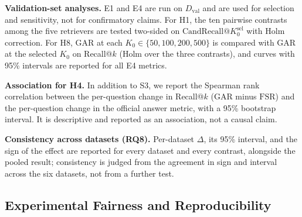 \documentclass[11pt,a4paper]{article}
\begin{document}
\textbf{Validation-set analyses.} E1 and E4 are run on $D_{\mathrm{val}}$ and are used for selection and sensitivity, not for confirmatory claims. For H1, the ten pairwise contrasts among the five retrievers are tested two-sided on $\mathrm{CandRecall}@K_0^{\mathrm{sel}}$ with Holm correction. For H8, GAR at each $K_0\in\{50,100,200,500\}$ is compared with GAR at the selected $K_0$ on Recall@$k$ (Holm over the three contrasts), and curves with 95\% intervals are reported for all E4 metrics.

\textbf{Association for H4.} In addition to S3, we report the Spearman rank correlation between the per-question change in Recall@$k$ (GAR minus $\mathrm{FSR}$) and the per-question change in the official answer metric, with a 95\% bootstrap interval. It is descriptive and reported as an association, not a causal claim.

\textbf{Consistency across datasets (RQ8).} Per-dataset $\Delta$, its 95\% interval, and the sign of the effect are reported for every dataset and every contrast, alongside the pooled result; consistency is judged from the agreement in sign and interval across the six datasets, not from a further test.

\subsection{Experimental Fairness and Reproducibility}
\label{sec:fairness}
\end{document}
